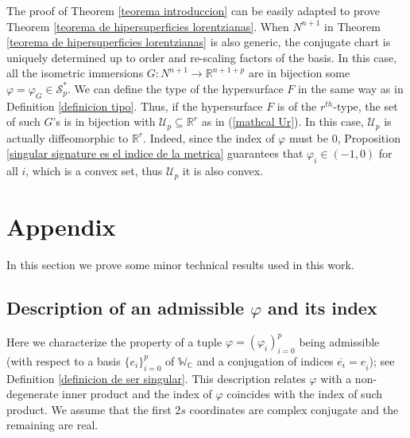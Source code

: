 \documentclass{article}
\theoremstyle{remark}
\begin{document}
The proof of Theorem \ref{teorema introduccion} can be easily adapted to prove Theorem \ref{teorema de hipersuperficies lorentzianas}. When $N^{n+1}$ in Theorem \ref{teorema de hipersuperficies lorentzianas} is also generic, the conjugate chart is uniquely determined up to order and re-scaling factors of the basis. In this case, all the isometric immersions $G:N^{n+1}\rightarrow\mathbb{R}^{n+1+p}$ are in bijection some $\varphi=\varphi_G\in\mathcal{S}_p^{*}$. We can define the type of the hypersurface $F$ in the same way as in Definition \ref{definicion tipo}.
Thus, if the hypersurface $F$ is of the $r^{th}$-type, the set of such $G$'s is in bijection with $\mathcal{U}_p\subseteq\mathbb{R}^{r}$ as in (\ref{mathcal Ur}). In this case, $\mathcal{U}_p$ is actually diffeomorphic to $\mathbb{R}^{r}$. 
Indeed, since the index of $\varphi$ must be $0$, Proposition \ref{singular signature es el indice de la metrica} guarantees that $\varphi_i\in(-1,0)$ for all $i$, which is a convex set, thus $\mathcal{U}_p$ it is also convex. 


\section{Appendix}\label{apendice}
In this section we prove some minor technical results used in this work.

\subsection{Description of an admissible \texorpdfstring{$\varphi$}{TEXT} and its index}
Here we characterize the property of a tuple $\varphi=(\varphi_i)_{i=0}^p$ being admissible (with respect to a basis $\{e_i\}_{i=0}^p$ of $\mathbb{W}_{\mathbb{C}}$ and a conjugation of indices $\overline{e_i}=e_{\overline{i}}$); see Definition \ref{definicion de ser singular}. This description relates $\varphi$ with a non-degenerate inner product and the index of $\varphi$ coincides with the index of such product. We assume that the first $2s$ coordinates are complex conjugate and the remaining are real.
\\\text{ }
\end{document}

